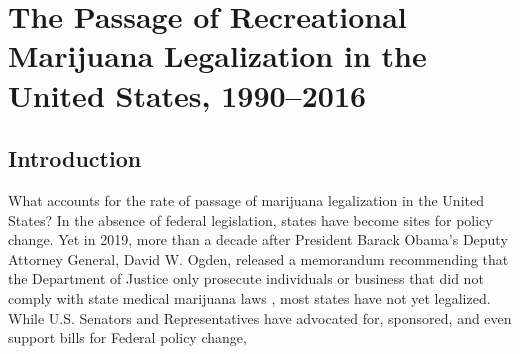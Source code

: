 \chapter{The Passage of Recreational Marijuana Legalization in the United States, 1990--2016}







\section{Introduction}

What accounts for the rate of passage of marijuana legalization in the United States? In the absence of federal legislation, states have become sites for policy change. Yet in 2019, more than a decade after President Barack Obama's Deputy Attorney General, David W. Ogden, released a memorandum recommending that the Department of Justice only prosecute individuals or business that did not comply with state medical marijuana laws \citep{ogden_2009}, most states have not yet legalized. While U.S. Senators and Representatives have advocated for, sponsored, and even support bills for Federal policy change, 


